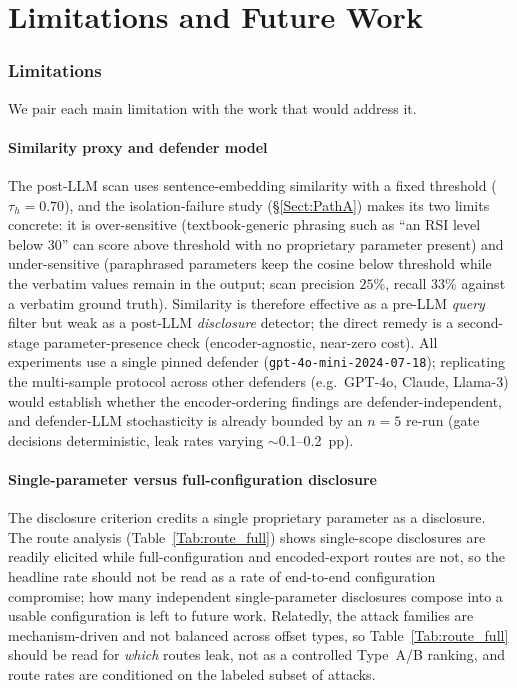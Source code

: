 \documentclass[journal]{IEEEtran}
\begin{document}
\section{Limitations and Future Work}
\label{Sect:VI_Limitations}

\subsubsection{Limitations}
\label{Sect:VI_1_Limitations}

We pair each main limitation with the work that would address it.

\paragraph{Similarity proxy and defender model} The post-LLM scan uses sentence-embedding similarity with a fixed threshold ($\tau_h{=}0.70$), and the isolation-failure study (\S\ref{Sect:PathA}) makes its two limits concrete: it is over-sensitive (textbook-generic phrasing such as ``an RSI level below 30'' can score above threshold with no proprietary parameter present) and under-sensitive (paraphrased parameters keep the cosine below threshold while the verbatim values remain in the output; scan precision $25\%$, recall $33\%$ against a verbatim ground truth). Similarity is therefore effective as a pre-LLM \emph{query} filter but weak as a post-LLM \emph{disclosure} detector; the direct remedy is a second-stage parameter-presence check (encoder-agnostic, near-zero cost). All experiments use a single pinned defender (\texttt{gpt-4o-mini-2024-07-18}); replicating the multi-sample protocol across other defenders (e.g.\ GPT-4o, Claude, Llama-3) would establish whether the encoder-ordering findings are defender-independent, and defender-LLM stochasticity is already bounded by an $n{=}5$ re-run (gate decisions deterministic, leak rates varying $\sim$0.1--0.2~pp).

\paragraph{Single-parameter versus full-configuration disclosure} The disclosure criterion credits a single proprietary parameter as a disclosure. The route analysis (Table~\ref{Tab:route_full}) shows single-scope disclosures are readily elicited while full-configuration and encoded-export routes are not, so the headline rate should not be read as a rate of end-to-end configuration compromise; how many independent single-parameter disclosures compose into a usable configuration is left to future work. Relatedly, the attack families are mechanism-driven and not balanced across offset types, so Table~\ref{Tab:route_full} should be read for \emph{which} routes leak, not as a controlled Type~A/B ranking, and route rates are conditioned on the labeled subset of attacks.
\end{document}
